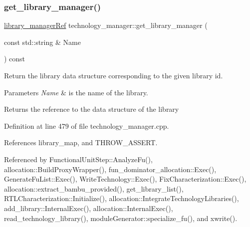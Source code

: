 \subsubsection{\texorpdfstring{get\+\_\+library\+\_\+manager()}{get\_library\_manager()}}
{\footnotesize\ttfamily \hyperlink{library__manager_8hpp_aacc6d633b0aa80ecfeb1180fd480ae68}{library\+\_\+manager\+Ref} technology\+\_\+manager\+::get\+\_\+library\+\_\+manager (\begin{DoxyParamCaption}\item[{const std\+::string \&}]{Name }\end{DoxyParamCaption}) const}



Return the library data structure corresponding to the given library id. 


\begin{DoxyParams}{Parameters}
{\em Name} & is the name of the library. \\
\hline
\end{DoxyParams}
\begin{DoxyReturn}{Returns}
the reference to the data structure of the library 
\end{DoxyReturn}


Definition at line 479 of file technology\+\_\+manager.\+cpp.



References library\+\_\+map, and T\+H\+R\+O\+W\+\_\+\+A\+S\+S\+E\+RT.



Referenced by Functional\+Unit\+Step\+::\+Analyze\+Fu(), allocation\+::\+Build\+Proxy\+Wrapper(), fun\+\_\+dominator\+\_\+allocation\+::\+Exec(), Generate\+Fu\+List\+::\+Exec(), Write\+Technology\+::\+Exec(), Fix\+Characterization\+::\+Exec(), allocation\+::extract\+\_\+bambu\+\_\+provided(), get\+\_\+library\+\_\+list(), R\+T\+L\+Characterization\+::\+Initialize(), allocation\+::\+Integrate\+Technology\+Libraries(), add\+\_\+library\+::\+Internal\+Exec(), allocation\+::\+Internal\+Exec(), read\+\_\+technology\+\_\+library(), module\+Generator\+::specialize\+\_\+fu(), and xwrite().

